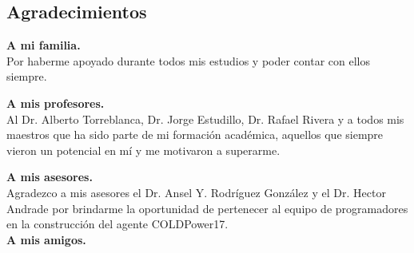 \begin{center}
	\section*{Agradecimientos}   
\end{center}
\setcounter{page}{1}

\textbf{A mi familia.}\\
Por haberme apoyado durante todos mis estudios y poder contar con ellos siempre.

\textbf{A mis profesores.}
\\
Al Dr. Alberto Torreblanca, Dr. Jorge Estudillo, Dr. Rafael Rivera
y a todos mis maestros que ha sido parte de mi formación académica, aquellos que siempre vieron un potencial en mí y me motivaron a superarme.	

\textbf{A mis asesores.}\\
Agradezco a mis asesores el Dr. Ansel Y. Rodríguez González y el Dr. Hector Andrade por brindarme la oportunidad de pertenecer al equipo de programadores en la construcción del agente COLDPower17.
\\

\textbf{A mis amigos.}
